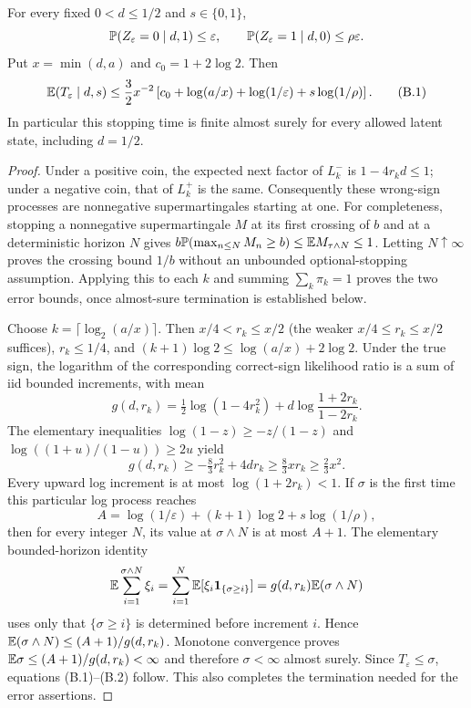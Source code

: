 \begin{lemma}\label{above:lem:classifier}
For every fixed $0<d\le1/2$ and $s\in\{0,1\}$,
\[
 \mathbb P(Z_\varepsilon=0\mid d,1)\le\varepsilon,
 \qquad \mathbb P(Z_\varepsilon=1\mid d,0)\le\rho\varepsilon.
\]
Put $x=\min(d,a)$ and $c_0=1+2\log2$. Then
\[
 \mathbb E(T_\varepsilon\mid d,s)
 \le\frac32x^{-2}\left[c_0+\log(a/x)+\log(1/\varepsilon)
                         +s\log(1/\rho)\right].           \tag{B.1}
\]
In particular this stopping time is finite almost surely for every allowed
latent state, including $d=1/2$.
\end{lemma}
\begin{proof}
Under a positive coin, the expected next factor of $L^-_k$ is
$1-4r_kd\le1$; under a negative coin, that of $L^+_k$ is the same.
Consequently these wrong-sign processes are nonnegative supermartingales
starting at one. For completeness, stopping a nonnegative supermartingale
$M$ at its first crossing of $b$ and at a deterministic horizon $N$ gives
$b\mathbb P(\max_{n\le N}M_n\ge b)\le\mathbb E M_{\tau\wedge N}\le1$.
Letting $N\uparrow\infty$ proves the crossing bound $1/b$ without an
unbounded optional-stopping assumption. Applying this to each $k$ and summing
$\sum_k\pi_k=1$ proves the two error bounds, once almost-sure termination is
established below.

Choose $k=\lceil\log_2(a/x)\rceil$. Then $x/4<r_k\le x/2$ (the weaker
$x/4\le r_k\le x/2$ suffices), $r_k\le1/4$, and
$(k+1)\log2\le\log(a/x)+2\log2$.
Under the true sign, the logarithm of the corresponding correct-sign
likelihood ratio is a sum of iid bounded increments, with mean
\[
 g(d,r_k)=\tfrac12\log(1-4r_k^2)
                +d\log\frac{1+2r_k}{1-2r_k}.
\]
The elementary inequalities
$\log(1-z)\ge-z/(1-z)$ and
$\log((1+u)/(1-u))\ge2u$ yield
\[
 g(d,r_k)\ge-\tfrac83r_k^2+4dr_k
            \ge\tfrac83xr_k\ge\tfrac23x^2.               \tag{B.2}
\]
Every upward log increment is at most $\log(1+2r_k)<1$.
If $\sigma$ is the first time this particular log process reaches
\[
 A=\log(1/\varepsilon)+(k+1)\log2+s\log(1/\rho),
\]
then for every integer $N$, its value at $\sigma\wedge N$ is at most $A+1$.
The elementary bounded-horizon identity
\[
 \mathbb E\sum_{i=1}^{\sigma\wedge N}\xi_i
   =\sum_{i=1}^N\mathbb E[\xi_i\mathbf 1_{\{\sigma\ge i\}}]
   =g(d,r_k)\mathbb E(\sigma\wedge N)
\]
uses only that $\{\sigma\ge i\}$ is determined before increment $i$.
Hence $\mathbb E(\sigma\wedge N)\le(A+1)/g(d,r_k)$.
Monotone convergence proves $\mathbb E\sigma\le(A+1)/g(d,r_k)<\infty$ and
therefore $\sigma<\infty$ almost surely. Since $T_\varepsilon\le\sigma$,
equations (B.1)--(B.2) follow. This also completes the termination needed for
the error assertions.
\end{proof}

